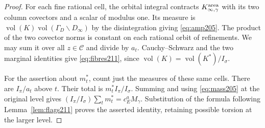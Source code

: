 \documentclass[a4paper,11pt]{article}
\theoremstyle{definition}
\theoremstyle{remark}
\numberwithin{equation}{section}
\begin{document}
\begin{proof}
For each fine rational cell, the orbital integral contracts
\(K_{\infty,\gamma}^{\rm area}\) with its two column covectors
and a scalar of modulus one. Its measure is
\(\operatorname{vol}(K)\operatorname{vol}(\Gamma_D\backslash D_\infty)\)
by the disintegration giving \eqref{eq:amp205}. The product of
the two covector norms is constant on each rational orbit of
refinements. We may sum it over all \(z\in\mathcal C\) and
divide by \(a_t\). Cauchy--Schwarz and the two marginal identities
give \eqref{eq:fibres211}, since
\(\operatorname{vol}(K)=\operatorname{vol}(K^*)/I_\sigma\).

For the assertion about \(m_t^*\), count just the measures of
these same cells. There are \(I_\pi/a_t\) above \(t\). Their
total is \(m_t^* I_\pi/I_\sigma\). Summing and using
\eqref{eq:mass205} at the original level gives
\((I_\pi/I_\sigma)\sum_t m_t^*=c_E^a M_\gamma\).
Substitution of the formula following Lemma~\ref{lem:flags211}
proves the asserted identity, retaining possible torsion at
the larger level.
\end{proof}
\end{document}
